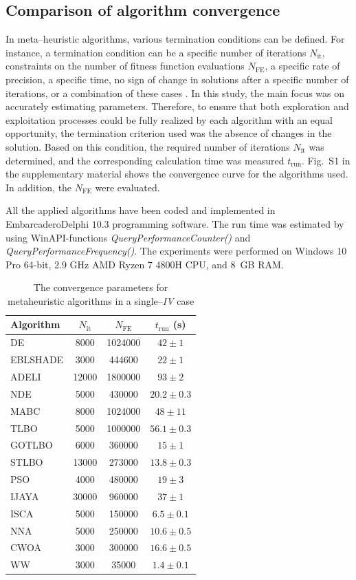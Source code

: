 \documentclass[a4paper,fleqn]{cas-sc}
\begin{document}
\subsection{Comparison of algorithm convergence}
In meta--heuristic algorithms, various termination conditions can be defined.
For instance, a termination condition can be a specific number of iterations $N_\mathrm{it}$,
constraints on the number of fitness function evaluations $N_\mathrm{FE}$,
a specific rate of precision,
a specific time,
no sign of change in solutions after a specific number of iterations,
or a combination of these cases \cite{IntelligentChaoticClonal}.
In this study, the main focus was on accurately estimating parameters.
Therefore, to ensure that both exploration and exploitation processes
could be fully realized by each algorithm with an equal opportunity,
the termination criterion used was the absence of changes in the solution.
Based on this condition, the required number of iterations $N_\mathrm{it}$ was determined,
and the corresponding calculation time was measured $t_\mathrm{run}$.
Fig.~S1 in the supplementary material shows the convergence curve for the algorithms used.
In addition, the $N_\mathrm{FE}$ were evaluated.

All the applied algorithms have been coded and implemented in Embarcadero\textregistered Delphi $10.3$ programming software.
The run time was estimated by using WinAPI-functions \emph{QueryPerformanceCounter()} and \emph{QueryPerformanceFrequency()}.
The experiments were performed on Windows 10 Pro 64-bit,
2.9 GHz AMD Ryzen 7 4800H CPU, and 8~GB RAM.


\begin{table}[<options>]
\caption{The convergence parameters for metaheuristic algorithms in a single--\emph{IV} case}\label{tblRun}
\begin{tabular*}{\tblwidth}{@{}LCCC@{}}
\toprule
Algorithm  &  $N_\mathrm{it}$ & $N_\mathrm{FE}$ & $t_\mathrm{run}$ (s)\\ %
\midrule
DE & 8000& 1024000& $42\pm1$\\
EBLSHADE & 3000& 444600& $22\pm1$\\
ADELI & 12000& 1800000& $93\pm2$\\
NDE & 5000& 430000&$20.2\pm0.3$ \\
MABC & 8000& 1024000&$48\pm11$ \\
TLBO & 5000& 1000000&$56.1\pm0.3$ \\
GOTLBO & 6000& 360000&$15\pm1$ \\
STLBO & 13000& 273000&$13.8\pm0.3$ \\
PSO & 4000& 480000&$19\pm3$ \\
IJAYA & 30000& 960000&$37\pm1$ \\
ISCA & 5000& 150000&$6.5\pm0.1$ \\
NNA & 5000& 250000&$10.6\pm0.5$ \\
CWOA & 3000& 300000&$16.6\pm0.5$ \\
WW & 3000& 35000&$1.4\pm0.1$ \\
\bottomrule
\end{tabular*}
\end{table}
\end{document}
